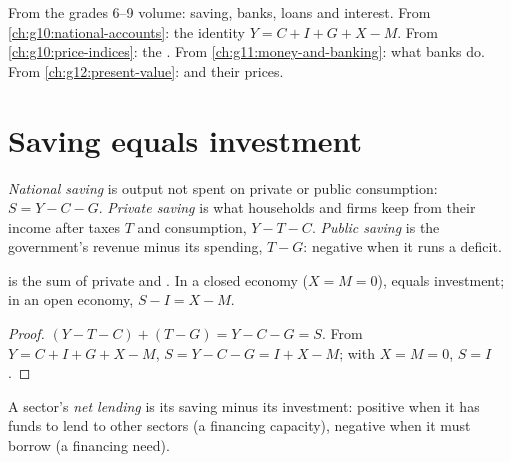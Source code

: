 \begin{recall}
From the grades 6--9 volume: saving, banks, loans and interest. From \cref{ch:g10:national-accounts}: the identity $Y = C + I + G + X - M$. From \cref{ch:g10:price-indices}:
the . From \cref{ch:g11:money-and-banking}: what banks do. From \cref{ch:g12:present-value}:  and their prices.
\end{recall}

\section{Saving equals investment}\label{sec:g12:saving-and-investment:identity}

\begin{definition}\label{def:g12:saving-and-investment:national-saving}
\emph{National saving} is output not spent on private or public consumption: $S = Y - C - G$. \emph{Private saving}%
\label{def:g12:saving-and-investment:private-saving} is what households and firms keep from their income after taxes $T$ and consumption, $Y - T - C$.
\emph{Public saving}\label{def:g12:saving-and-investment:public-saving} is the government's revenue minus its spending, $T - G$:
negative when it runs a deficit.
\end{definition}

\begin{proposition}\label{prop:g12:saving-and-investment:identity}
 is the sum of private and . In a closed economy ($X = M = 0$),  equals investment; in an open economy, $S - I = X - M$.
\end{proposition}
\begin{proof}
$(Y - T - C) + (T - G) = Y - C - G = S$. From $Y = C + I + G + X - M$, $S = Y - C - G = I + X - M$; with $X = M = 0$, $S = I$.
\end{proof}

\begin{definition}\label{def:g12:saving-and-investment:net-lending}
A sector's \emph{net lending} is its saving minus its investment: positive when it has funds to lend to other sectors (a financing capacity), negative
when it must borrow (a financing need).
\end{definition}

